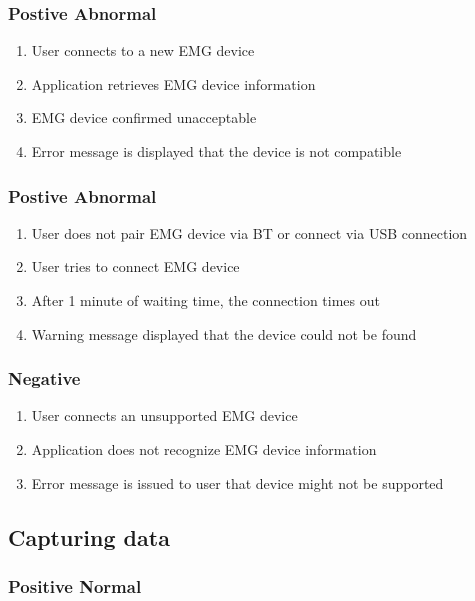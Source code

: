 \documentclass[12pt,a4paper]{article}
\begin{document}
\subsubsection{Postive Abnormal}

\begin{enumerate}
	\item User connects to a new EMG device
	\item Application retrieves EMG device information
	\item EMG device confirmed unacceptable
	\item Error message is displayed that the device is not compatible 
\end{enumerate}

\subsubsection{Postive Abnormal}

\begin{enumerate}
	\item User does not pair EMG device via BT or connect via USB connection
	\item User tries to connect EMG device
	\item After 1 minute of waiting time, the connection times out
	\item Warning message displayed that the device could not be found
\end{enumerate}

\subsubsection{Negative}

\begin{enumerate}
	\item User connects an unsupported EMG device
	\item Application does not recognize EMG device information
	\item Error message is issued to user that device might not be supported
\end{enumerate}

\subsection{Capturing data}

\subsubsection{Positive Normal}
\end{document}
